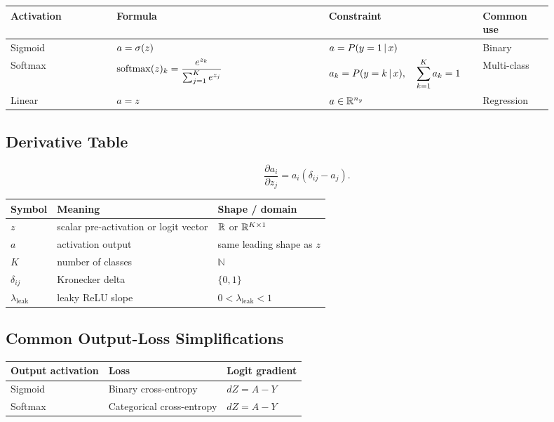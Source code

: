 \begin{center}
\begin{tabular}{>{\raggedright\arraybackslash}p{0.18\linewidth}
                >{\raggedright\arraybackslash}p{0.36\linewidth}
                >{\raggedright\arraybackslash}p{0.24\linewidth}
                >{\raggedright\arraybackslash}p{0.12\linewidth}}
\toprule
Activation & Formula & Constraint & Common use \\
\midrule
Sigmoid &
\(\displaystyle a=\sigma(z)\) &
\(a=P(y=1\,|\, x)\) &
Binary \\
\addlinespace
Softmax &
\(\displaystyle \operatorname{softmax}(z)_k =
\frac{e^{z_k}}{\sum_{j=1}^{K}e^{z_j}}\) &
\(\displaystyle a_k=P(y=k\,|\, x),\quad \sum_{k=1}^{K}a_k=1\) &
Multi-class \\
\addlinespace
Linear &
\(\displaystyle a=z\) &
\(a \in \mathbb{R}^{n_y}\) &
Regression \\
\bottomrule
\end{tabular}
\end{center}

\subsection{Derivative Table}

\[
\frac{\partial a_i}{\partial z_j}
=
a_i(\delta_{ij}-a_j).
\]

\begin{center}
\begin{tabular}{lll}
\toprule
Symbol & Meaning & Shape / domain \\
\midrule
$z$ & scalar pre-activation or logit vector & $\mathbb{R}$ or $\mathbb{R}^{K \times 1}$ \\
$a$ & activation output & same leading shape as $z$ \\
$K$ & number of classes & $\mathbb{N}$ \\
$\delta_{ij}$ & Kronecker delta & $\{0,1\}$ \\
$\lambda_{\mathrm{leak}}$ & leaky ReLU slope & $0 < \lambda_{\mathrm{leak}} < 1$ \\
\bottomrule
\end{tabular}
\end{center}

\subsection{Common Output-Loss Simplifications}

\begin{center}
\begin{tabular}{lll}
\toprule
Output activation & Loss & Logit gradient \\
\midrule
Sigmoid & Binary cross-entropy & $dZ=A-Y$ \\
Softmax & Categorical cross-entropy & $dZ=A-Y$ \\
\bottomrule
\end{tabular}
\end{center}
